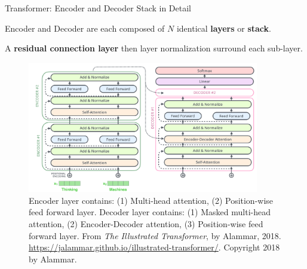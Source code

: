 \begin{frame}{Transformer: Encoder and Decoder Stack in Detail}

    \begin{itemizeSpaced}{2pt}
        \item Encoder and Decoder are each composed of $N$ identical \textbf{layers} or \textbf{stack}.
    
        \item A \textbf{residual connection layer} then layer normalization surround each sub-layer.  
    
    
    \end{itemizeSpaced}
    
    
    \begin{figure}[h]
    \vspace{-10pt}
    \centering
    \includegraphics[width=0.9\textwidth]{imgs/encoderDecoderLayersDetailed.png}
    \vspace{-10pt}
    \caption{\linespread{0.4} \footnotesize Encoder layer contains: (1) Multi-head attention, (2) Position-wise feed forward layer. Decoder layer contains: (1) Masked multi-head attention, (2) Encoder-Decoder attention, (3) Position-wise feed forward layer. From \emph{The Illustrated Transformer}, by Alammar, 2018. \url{https://jalammar.github.io/illustrated-transformer/}. Copyright 2018 by Alammar. }
    \vspace{-5pt}
    \label{fig:encDecLayersDetailed}
    \end{figure}
    
\end{frame}



